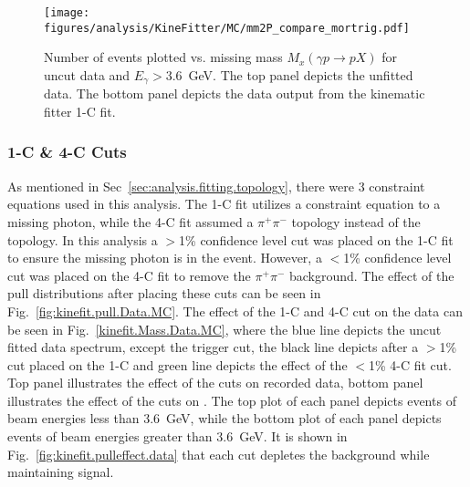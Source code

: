 \begin{figure}[h!]\begin{center}
\texttt{[image: \\figures/analysis/KineFitter/MC/mm2P\_compare\_mortrig.pdf]}
\caption[Number of  events plotted vs. missing mass $M_x(\gamma p \to p X)$ for uncut data and $E_\gamma > 3.6$~GeV]{\label{fig:kinfit.effect_morMC}Number of  events plotted vs. missing mass $M_x(\gamma p \to p X)$ for uncut data and $E_\gamma > 3.6$~GeV. The top panel depicts the unfitted data. The bottom panel depicts the data output from the kinematic fitter 1-C fit.}
\end{center}\end{figure}
\FloatBarrier

\subsubsection{1-C \& 4-C Cuts}
As mentioned in Sec~\ref{sec:analysis.fitting.topology}, there were 3 constraint equations used in this analysis. The 1-C fit utilizes a constraint equation to a missing photon, while the 4-C fit assumed a $\pi^+\pi^-$ topology instead of the \epemT topology. In this analysis a $>$1\% confidence level cut was placed on the 1-C fit to ensure the missing photon is in the event. However, a $<$1\% confidence level cut was placed on the 4-C fit to remove the $\pi^+\pi^-$ background. The effect of the pull distributions after placing these cuts can be seen in Fig.~\ref{fig:kinefit.pull.Data.MC}. The effect of the 1-C and 4-C cut on the data can be seen in Fig.~\ref{kinefit.Mass.Data.MC}, where the blue line depicts the uncut fitted data spectrum, except the trigger cut, the black line depicts after a $>$1\% cut placed on the 1-C and green line depicts the effect of the $<$1\% 4-C fit cut. Top panel illustrates the effect of the cuts on recorded data, bottom panel illustrates the effect of the cuts on . The top plot of each panel depicts events of beam energies less than 3.6~GeV, while the bottom plot of each panel depicts events of beam energies greater than 3.6~GeV. It is shown in Fig.~\ref{fig:kinefit.pulleffect.data} that each cut depletes the background while maintaining signal.


